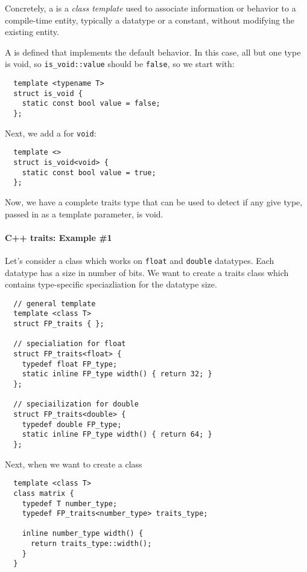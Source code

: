\documentclass{memo}
\begin{document}
Concretely, a  is a {\em class template\/} used to
associate information or behavior to a compile-time entity, typically a
datatype or a constant, without modifying the existing entity.

A  is defined that implements the default behavior.
In this case, all but one type is void, so \verb+is_void::value+ should be
\verb+false+, so we start with:
\begin{verbatim}
  template <typename T>
  struct is_void {
    static const bool value = false;
  };
\end{verbatim}
Next, we add a  for \verb+void+:
\begin{verbatim}
  template <>
  struct is_void<void> {
    static const bool value = true;
  };
\end{verbatim}
Now, we have a complete traits type that can be used to detect if any give
type, passed in as a template parameter, is void. 

\paragraph{C++ traits: Example \#1}
Let's consider a class which works on {\tt float} and {\tt double}
datatypes. Each datatype has a size in number of bits.
We want to create a traits class which contains type-specific speciazliation
for the datatype size. 
\begin{verbatim}
  // general template
  template <class T>
  struct FP_traits { };

  // specialiation for float
  struct FP_traits<float> {
    typedef float FP_type;
    static inline FP_type width() { return 32; }
  };

  // speciailization for double
  struct FP_traits<double> {
    typedef double FP_type;
    static inline FP_type width() { return 64; }
  };
\end{verbatim}
Next, when we want to create a class 
\begin{verbatim}
  template <class T>
  class matrix {
    typedef T number_type;
    typedef FP_traits<number_type> traits_type;

    inline number_type width() { 
      return traits_type::width();
    }
  }
\end{verbatim}
\end{document}
